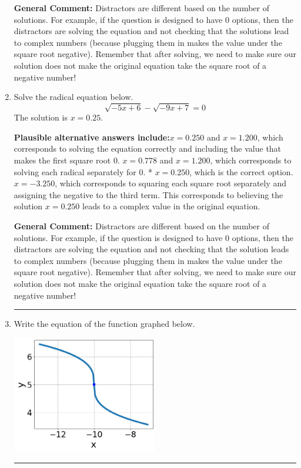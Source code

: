 \documentclass{extbook}[14pt]
\newcommand{\litem}[1]{\item #1

\rule{\textwidth}{0.4pt}}
\begin{document}
\begin{enumerate}
{\textbf{General Comment:} Distractors are different based on the number of solutions. For example, if the question is designed to have 0 options, then the distractors are solving the equation and not checking that the solutions lead to complex numbers (because plugging them in makes the value under the square root negative). Remember that after solving, we need to make sure our solution does not make the original equation take the square root of a negative number!
}
\litem{
Solve the radical equation below.
\[ \sqrt{-5 x + 6} - \sqrt{-9 x + 7} = 0 \]The solution is \( x = 0.25 \).\begin{enumerate}[label=\Alph*.]
\textbf{Plausible alternative answers include:}$x = 0.250$ and $x = 1.200$, which corresponds to solving the equation correctly and including the value that makes the first square root 0.
$x = 0.778$ and $x = 1.200$, which corresponds to solving each radical separately for 0.
* $x = 0.250$, which is the correct option.
$x = -3.250$, which corresponds to squaring each square root separately and assigning the negative to the third term.
This corresponds to believing the solution $x = 0.250$ leads to a complex value in the original equation.
\end{enumerate}

\textbf{General Comment:} Distractors are different based on the number of solutions. For example, if the question is designed to have 0 options, then the distractors are solving the equation and not checking that the solution leads to complex numbers (because plugging them in makes the value under the square root negative). Remember that after solving, we need to make sure our solution does not make the original equation take the square root of a negative number!
}
\litem{
Write the equation of the function graphed below.

\begin{center}
    \includegraphics[width=0.5\textwidth]{../Figures/radicalGraphToEquationC.png}
\end{center}


}
\end{enumerate}
\end{document}
